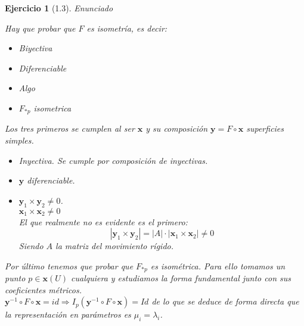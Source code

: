 \documentclass[a4paper,10pt]{article}
\newtheorem{ejercicio}{Ejercicio}[section]
\begin{document}
\begin{ejercicio}[1.3]
Enunciado

Hay que probar que $F$ es isometría, es decir:
\begin{itemize}
	\item Biyectiva
	\item Diferenciable
	\item Algo
	\item $F_{*p}$ isometrica
\end{itemize}
Los tres primeros se cumplen al ser $\mathbf{x}$ y su composición $\mathbf{y}=F\circ \mathbf{x}$ superficies simples.\\
\begin{itemize}
\item Inyectiva. Se cumple por composición de inyectivas.
\item $\mathbf{y}$ diferenciable.
\item $\mathbf{y}_1\times \mathbf{y}_2\neq 0$.\\
 $\mathbf{x}_1\times \mathbf{x}_2\neq 0$\\
 El que realmente no es evidente es el primero:
 \[
 |\mathbf{y}_1\times \mathbf{y}_2|=|A|\cdot|\mathbf{x}_1\times \mathbf{x}_2|\neq 0
 \]
 Siendo $A$ la matriz del movimiento rígido.
\end{itemize}

Por último tenemos que probar que $F_{*p}$ es isométrica. Para ello tomamos un punto $p\in \mathbf{x}(U)$ cualquiera y estudiamos la forma fundamental junto con sus coeficientes métricos.\\
$\mathbf{y}^{-1}\circ F\circ \mathbf{x}=id \Rightarrow I_p(\mathbf{y}^{-1}\circ F\circ \mathbf{x})=Id$ de lo que se deduce de forma directa que la representación en parámetros es $\mu_i=\lambda_i$.
\end{ejercicio}
\end{document}
